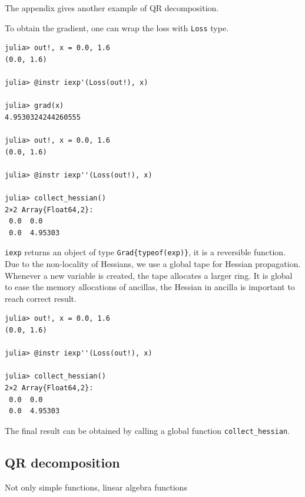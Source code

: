 \documentclass[aps,twocolumn,longbibliography,english,superscriptaddress,prr]{revtex4-1}
\newcommand{\<}{\langle}
\renewcommand{\>}{\rangle}
\theoremstyle{definition}\newtheorem{definition}{\textit{Definition}}
\begin{document}
The appendix gives another example of QR decomposition.

To obtain the gradient, one can wrap the loss with \texttt{Loss} type.

\begin{minipage}{.44\textwidth}
\begin{lstlisting}
julia> out!, x = 0.0, 1.6
(0.0, 1.6)

julia> @instr iexp'(Loss(out!), x)

julia> grad(x)
4.9530324244260555

julia> out!, x = 0.0, 1.6
(0.0, 1.6)

julia> @instr iexp''(Loss(out!), x)

julia> collect_hessian()
2×2 Array{Float64,2}:
 0.0  0.0
 0.0  4.95303
\end{lstlisting}
\end{minipage}

\texttt{iexp\textquotesingle} returns an object of type \texttt{Grad\{typeof(exp)\}}, it is a reversible function.
Due to the non-locality of Hessians, we use a global tape for Hessian propagation. Whenever a new variable is created, the tape allocates a larger ring.
It is global to ease the memory allocations of ancillas, the Hessian in ancilla is important to reach correct result.

\begin{minipage}{.44\textwidth}
\begin{lstlisting}
julia> out!, x = 0.0, 1.6
(0.0, 1.6)

julia> @instr iexp''(Loss(out!), x)

julia> collect_hessian()
2×2 Array{Float64,2}:
 0.0  0.0
 0.0  4.95303
\end{lstlisting}
\end{minipage}

The final result can be obtained by calling a global function \texttt{collect\_hessian}.

\subsection{QR decomposition}

Not only simple functions, linear algebra functions 
\end{document}
